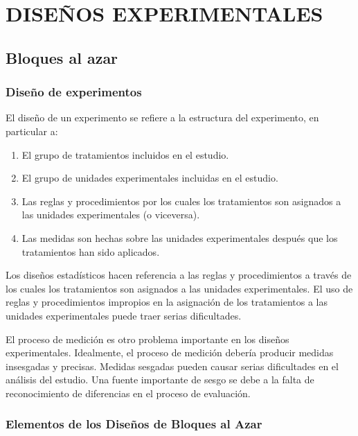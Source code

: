 \documentclass[]{book}
\theoremstyle{definition}
\theoremstyle{definition}
\theoremstyle{definition}
\theoremstyle{remark}
\begin{document}
\hypertarget{disenos-experimentales}{%
\chapter{DISEÑOS EXPERIMENTALES}\label{disenos-experimentales}}

\hypertarget{bloques-al-azar}{%
\section{Bloques al azar}\label{bloques-al-azar}}

\hypertarget{diseno-de-experimentos}{%
\subsection{Diseño de experimentos}\label{diseno-de-experimentos}}

El diseño de un experimento se refiere a la estructura del experimento,
en particular a:

\begin{enumerate}
\def\labelenumi{\arabic{enumi}.}
\item
  El grupo de tratamientos incluidos en el estudio.
\item
  El grupo de unidades experimentales incluidas en el estudio.
\item
  Las reglas y procedimientos por los cuales los tratamientos son
  asignados a las unidades experimentales (o viceversa).
\item
  Las medidas son hechas sobre las unidades experimentales después que
  los tratamientos han sido aplicados.
\end{enumerate}

Los diseños estadísticos hacen referencia a las reglas y procedimientos
a través de los cuales los tratamientos son asignados a las unidades
experimentales. El uso de reglas y procedimientos impropios en la
asignación de los tratamientos a las unidades experimentales puede traer
serias dificultades.

El proceso de medición es otro problema importante en los diseños
experimentales. Idealmente, el proceso de medición debería producir
medidas insesgadas y precisas. Medidas sesgadas pueden causar serias
dificultades en el análisis del estudio. Una fuente importante de sesgo
se debe a la falta de reconocimiento de diferencias en el proceso de
evaluación.

\hypertarget{elementos-de-los-disenos-de-bloques-al-azar}{%
\subsection{Elementos de los Diseños de Bloques al
Azar}\label{elementos-de-los-disenos-de-bloques-al-azar}}
\end{document}
